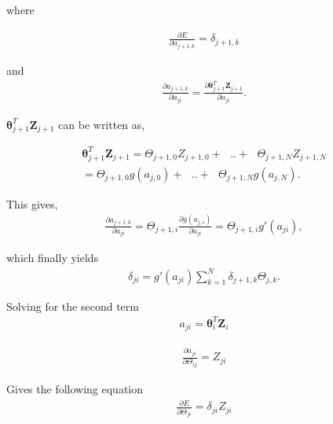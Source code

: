             where
            
            \begin{align}
                 \frac{\partial E}{\partial a_{j+1,k}} = \delta_{j+1,k}
            \end{align}
            
            and
            \begin{align}
                \frac{\partial a_{j+1,k}}{\partial a_{ji}} = \frac{\partial \bm \theta_{j+1}^T \bm Z_{j+1}}{\partial a_{ji}}. \label{bp:4}
            \end{align}
            
            $\bm \theta_{j+1}^T \bm Z_{j+1}$ can be written as, 
            
            \begin{align*}
                \bm \theta_{j+1}^T \bm Z_{j+1} = \Theta_{j+1,0}Z_{j+1,0} +\textit{ }..+ \textit{ }\Theta_{j+1,N}Z_{j+1,N} \nonumber \\
                = \Theta_{j+1,0}g(a_{j,0}) + \textit{ }.. +\textit{ }\Theta_{j+1,N}g(a_{j,N}). \label{bp:5}
            \end{align*}
            
            This gives, 
            \begin{align}
                \frac{\partial a_{j+1,k}}{\partial a_{ji}} = \Theta_{j+1,i}\frac{\partial g(a_{j,i})}{\partial a_{ji}} =  \Theta_{j+1,i}g'(a_{ji}), \label{bp:6} 
            \end{align}
            
            which finally yields
            \begin{align}
                \delta_{ji} = g'(a_{ji})\sum_{k=1}^N\delta_{j+1,k}\Theta_{j,k}. \label{bp:7}
            \end{align}                    
            
            Solving for the second term
            \begin{align}
                a_{ji} = \bm \theta^T_i \bm Z_{i} \label{bp:10}
            \end{align}
            
            \begin{align}
                \frac{\partial a_{ji}}{\partial \Theta_{ij}} =  Z_{ji} \label{bp:8}
            \end{align}
            
            Gives the following equation
            \begin{align}
                \frac{\partial E}{\partial \Theta_{ji}} = \delta_{ji}Z_{ji} \label{bp:9}
            \end{align}
            
